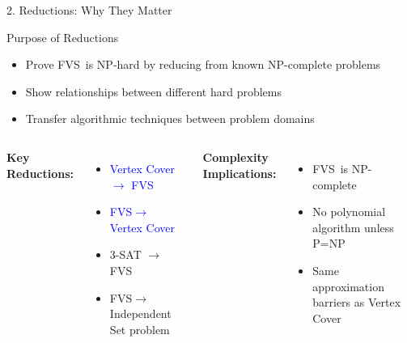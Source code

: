 \documentclass[aspectratio=169]{beamer}
\newcommand{\fvs}{\textsc{FVS}}
\newcommand{\np}{\textsc{NP}}
\begin{document}
\begin{frame}{2. Reductions: Why They Matter}
  \begin{block}{Purpose of Reductions}
    \begin{itemize}
      \item Prove \fvs\ is \np-hard by reducing from known \np-complete problems
      \item Show relationships between different hard problems
      \item Transfer algorithmic techniques between problem domains
    \end{itemize}
  \end{block}
  
  \vspace{0.5cm}
  
  \begin{columns}[T]
    \textbf{Key Reductions:}
		\begin{itemize}
			\item \textcolor{blue}{Vertex Cover $\rightarrow$ \fvs}
			\item \textcolor{blue}{\fvs $\rightarrow$ Vertex Cover}
			\item 3-SAT $\rightarrow$ \fvs
			\item \fvs $\rightarrow$ Independent Set problem
		\end{itemize}
    
    \textbf{Complexity Implications:}
    \begin{itemize}
      \item \fvs\ is \np-complete
      \item No polynomial algorithm unless P=NP
      \item Same approximation barriers as Vertex Cover
    \end{itemize}
  \end{columns}
\end{frame}
\end{document}
